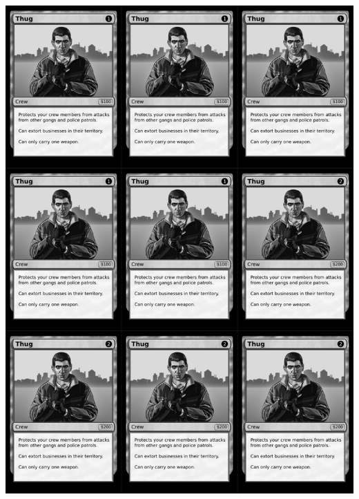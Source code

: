 \documentclass[a4paper]{article}
\begin{document}
\newpage

\begin{center}
	\centering
	\includegraphics[width=200.5mm,height=280.7mm]{output/temp/page16.png}
\end{center}
\end{document}
